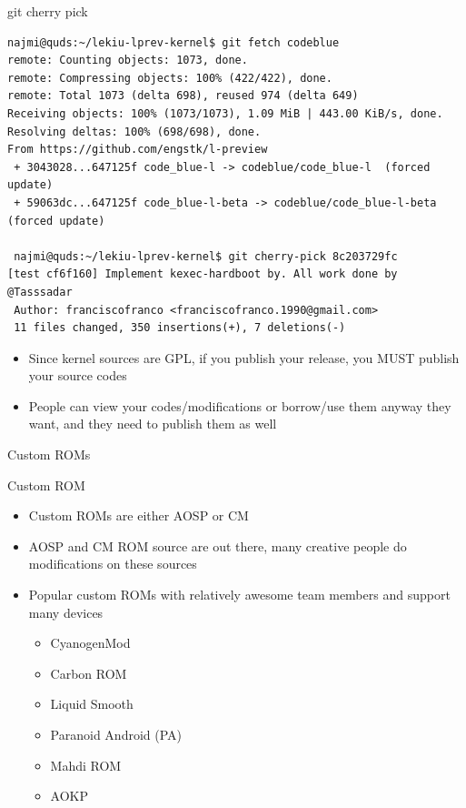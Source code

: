 \documentclass{beamer}
\begin{document}
\begin{frame}[fragile]{git cherry pick}
 \tiny \begin{Verbatim}        
najmi@quds:~/lekiu-lprev-kernel$ git fetch codeblue 
remote: Counting objects: 1073, done.
remote: Compressing objects: 100% (422/422), done.
remote: Total 1073 (delta 698), reused 974 (delta 649)
Receiving objects: 100% (1073/1073), 1.09 MiB | 443.00 KiB/s, done.
Resolving deltas: 100% (698/698), done.
From https://github.com/engstk/l-preview
 + 3043028...647125f code_blue-l -> codeblue/code_blue-l  (forced update)
 + 59063dc...647125f code_blue-l-beta -> codeblue/code_blue-l-beta  (forced update)

 najmi@quds:~/lekiu-lprev-kernel$ git cherry-pick 8c203729fc
[test cf6f160] Implement kexec-hardboot by. All work done by @Tasssadar
 Author: franciscofranco <franciscofranco.1990@gmail.com>
 11 files changed, 350 insertions(+), 7 deletions(-)
\end{Verbatim}
\end{frame}
   
\begin{frame}
 \begin{itemize}
  \item Since kernel sources are GPL, if you publish your release, you MUST publish your source codes
  \item People can view your codes/modifications or borrow/use them anyway they want, and they need to publish them as well  
 \end{itemize}
\end{frame}

\begin{frame}

\begin{center}
\Huge Custom ROMs
\end{center}

\end{frame}


\begin{frame}{Custom ROM}
\begin{itemize}
 \item Custom ROMs are either AOSP or CM
 \item AOSP and CM ROM source are out there, many creative people do modifications on these sources
 \item Popular custom ROMs with relatively awesome team members and support many devices
 \begin{itemize}
  \item CyanogenMod
  \item Carbon ROM 
  \item Liquid Smooth
  \item Paranoid Android (PA)
  \item Mahdi ROM
  \item AOKP
 \end{itemize}
\end{itemize} 
\end{frame}
\end{document}
